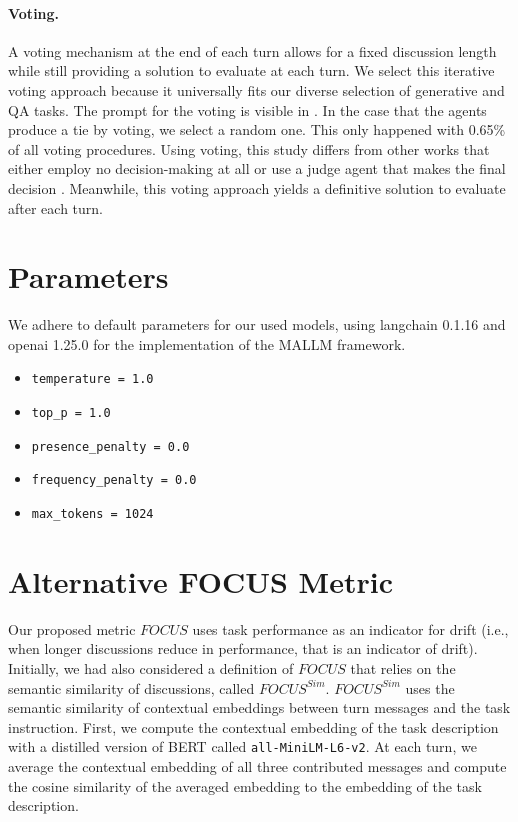 \paragraph{\textbf{Voting.}}
A voting mechanism at the end of each turn allows for a fixed discussion length while still providing a solution to evaluate at each turn.
We select this iterative voting approach because it universally fits our diverse selection of generative and QA tasks.
The prompt for the voting is visible in .
In the case that the agents produce a tie by voting, we select a random one.
This only happened with 0.65\% of all voting procedures.
Using voting, this study differs from other works that either employ no decision-making at all \citep{SchickDJP22a} or use a judge agent that makes the final decision \citep{SunYLW24}.
Meanwhile, this voting approach yields a definitive solution to evaluate after each turn.

\section{Parameters} \label{app:parameters}

We adhere to default parameters for our used models, using langchain 0.1.16 and openai 1.25.0 for the implementation of the MALLM framework.

\begin{itemize}[noitemsep]%
    \item \texttt{temperature = 1.0}
    \item \texttt{top\_p = 1.0}
    \item \texttt{presence\_penalty = 0.0}
    \item \texttt{frequency\_penalty = 0.0}
    \item \texttt{max\_tokens = 1024}
\end{itemize}


\section{Alternative FOCUS Metric}\label{app:alternative_metric}

Our proposed metric $FOCUS$ uses task performance as an indicator for drift (i.e., when longer discussions reduce in performance, that is an indicator of drift).
Initially, we had also considered a definition of $FOCUS$ that relies on the semantic similarity of discussions, called $FOCUS^{Sim}$.
$FOCUS^{Sim}$ uses the semantic similarity of contextual embeddings between turn messages and the task instruction.
First, we compute the contextual embedding of the task description with a distilled version of BERT \citep{devlin2019bertpretrainingdeepbidirectional} called \texttt{all-MiniLM-L6-v2}.
At each turn, we average the contextual embedding of all three contributed messages and compute the cosine similarity of the averaged embedding to the embedding of the task description.

